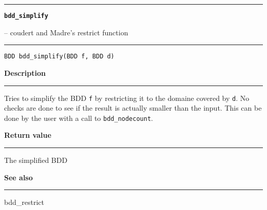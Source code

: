 \begin{minipage}{\textwidth}

\noindent\begin{minipage}{\textwidth}
\rule{\textwidth}{0.5mm}
{\tt\bf bdd\_simplify }
\--- coudert and Madre's restrict function  \hspace{\fill}
\\\rule[1.5ex]{\textwidth}{0.5mm}
\end{minipage}

\noindent\begin{verbatim}
BDD bdd_simplify(BDD f, BDD d) 
\end{verbatim}

\vspace{\parsep}\noindent
{\bf Description}\\\rule[1.5ex]{\textwidth}{0.2mm}\vspace{-1.5ex}\setlength{\parindent}{1em}
Tries to simplify the BDD {\tt f} by restricting it to the
           domaine covered by {\tt d}. No checks are done to see if the
	   result is actually smaller than the input. This can be done
	   by the user with a call to {\tt bdd\_nodecount}. 

\setlength{\parindent}{0em}\vspace{\parsep}\vspace{\baselineskip}\noindent
{\bf Return value}\\\rule[1.5ex]{\textwidth}{0.2mm}\vspace{-1.5ex}
The simplified BDD 

\vspace{\parsep}\vspace{\baselineskip}\noindent
{\bf See also}\\\rule[1.5ex]{\textwidth}{0.2mm}\vspace{-1.5ex}
bdd\_restrict 
\end{minipage}
\vspace{8ex}
